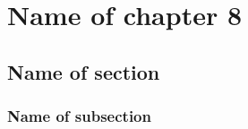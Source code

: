 

\graphicspath{{8/figures/}} %


\chapter{\label{ch8}Name of chapter 8} %

\section{\label{}Name of section}

\subsection{\label{}Name of subsection}




